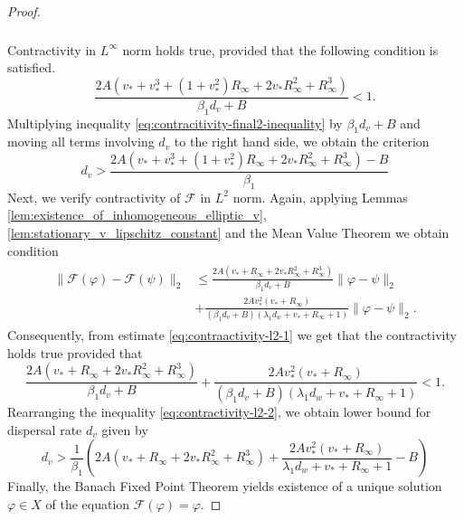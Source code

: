 \documentclass[11pt, a4paper]{article}
\theoremstyle{break}
\theoremstyle{break}
\theoremstyle{break}
\theoremstyle{break}
\theoremstyle{break}
\theoremstyle{break}
\theoremstyle{break}
\begin{document}
\begin{proof}
\begin{align}
\begin{split}
        \end{split}
    \end{align}
    Contractivity in $L^\infty$ norm holds true, provided that the following condition is satisfied.
    \begin{equation}
        \label{eq:contracitivity-final2-inequality}
        \frac{2A
        \left( v_* + v_*^3 + (1 + v_*^2)R_\infty + 2 v_* R_\infty^2 + R_\infty^3\right)}{\beta_1 d_v + B} <
        1.
    \end{equation}
    Multiplying inequality \eqref{eq:contracitivity-final2-inequality} by $\beta_1 d_v + B$ and moving all terms involving $d_v$ to the right hand side, we obtain the criterion
    \begin{equation}
        \label{eq:contractivity_final3_inequality}
        d_v
        >
        \frac{2A
        \left( v_* + v_*^3 + (1 + v_*^2)R_\infty + 2 v_* R_\infty^2 + R_\infty^3\right) - B}{\beta_1}
    \end{equation}
    Next, we verify contractivity of $\mathcal{F}$ in $L^2$ norm. Again, applying Lemmas \ref{lem:existence_of_inhomogeneous_elliptic_v}, \ref{lem:stationary_v_lipschitz_constant} and the Mean Value Theorem we obtain condition
    \begin{align}
        \label{eq:contraactivity-l2-1}
        \begin{split}
            \|\mathcal{F}(\varphi) - \mathcal{F}(\psi)\|_2
            &\leq
            \frac{2A
        \left( v_* + R_\infty + 2 v_* R_\infty^2 + R_\infty^3 \right)}{\beta_1 d_v + B} \|\varphi - \psi\|_2 \\
            &+ \frac{2Av_*^2(v_* + R_\infty)}{(\beta_1 d_v + B)(\lambda_1  d_w+ v_* + R_\infty + 1)} \|\varphi - \psi\|_2.
        \end{split}
    \end{align}
    Consequently, from estimate \eqref{eq:contraactivity-l2-1} we get that the contractivity holds true provided that
    \begin{equation}
        \label{eq:contractivity-l2-2}
        \frac{2A
        \left( v_* + R_\infty + 2 v_* R_\infty^2 + R_\infty^3 \right)}{\beta_1 d_v + B} +
        \frac{2Av_*^2(v_* + R_\infty)}{(\beta_1 d_v + B)(\lambda_1 d_w + v_* + R_\infty + 1)} <
        1.
    \end{equation}
    Rearranging the inequality \eqref{eq:contractivity-l2-2}, we obtain lower bound for dispersal rate $d_v$ given by
    \begin{equation}
        \label{eq:d_v_lowerbound_4}
        d_v > \frac{1}{\beta_1}\left( 2A
        \left( v_* + R_\infty + 2 v_* R_\infty^2 + R_\infty^3 \right) +
        \frac{2Av_*^2(v_* + R_\infty)}{ \lambda_1 d_w + v_* + R_\infty + 1} - B\right)
    \end{equation}
    Finally, the Banach Fixed Point Theorem yields existence of a unique solution $\varphi \in X$ of the equation $\mathcal{F}(\varphi) = \varphi$. 
\end{proof}
\end{document}
